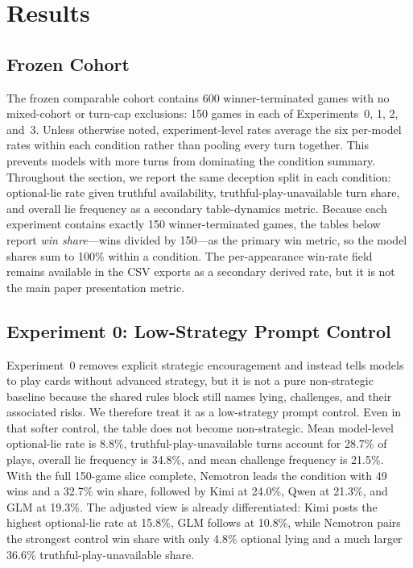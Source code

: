 \section{Results}

\subsection{Frozen Cohort}

The frozen comparable cohort contains 600 winner-terminated games with no mixed-cohort or turn-cap exclusions: 150 games in each of Experiments~0, 1, 2, and~3. Unless otherwise noted, experiment-level rates average the six per-model rates within each condition rather than pooling every turn together. This prevents models with more turns from dominating the condition summary. Throughout the section, we report the same deception split in each condition: optional-lie rate given truthful availability, truthful-play-unavailable turn share, and overall lie frequency as a secondary table-dynamics metric. Because each experiment contains exactly 150 winner-terminated games, the tables below report \emph{win share}---wins divided by 150---as the primary win metric, so the model shares sum to 100\% within a condition. The per-appearance win-rate field remains available in the CSV exports as a secondary derived rate, but it is not the main paper presentation metric.

\subsection{Experiment 0: Low-Strategy Prompt Control}

Experiment~0 removes explicit strategic encouragement and instead tells models to play cards without advanced strategy, but it is not a pure non-strategic baseline because the shared rules block still names lying, challenges, and their associated risks. We therefore treat it as a low-strategy prompt control. Even in that softer control, the table does not become non-strategic. Mean model-level optional-lie rate is 8.8\%, truthful-play-unavailable turns account for 28.7\% of plays, overall lie frequency is 34.8\%, and mean challenge frequency is 21.5\%. With the full 150-game slice complete, Nemotron leads the condition with 49 wins and a 32.7\% win share, followed by Kimi at 24.0\%, Qwen at 21.3\%, and GLM at 19.3\%. The adjusted view is already differentiated: Kimi posts the highest optional-lie rate at 15.8\%, GLM follows at 10.8\%, while Nemotron pairs the strongest control win share with only 4.8\% optional lying and a much larger 36.6\% truthful-play-unavailable share.

